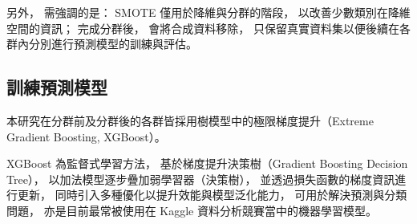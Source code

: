 \documentclass[12pt,a4paper,oneside]{book}
\begin{document}
\begin{enumerate}
	另外，
	需強調的是：
	SMOTE 僅用於降維與分群的階段，
	以改善少數類別在降維空間的資訊；
	完成分群後，
	會將合成資料移除，
	只保留真實資料集以便後續在各群內分別進行預測模型的訓練與評估。

		
	\end{enumerate}

	\subsection{訓練預測模型}

	本研究在分群前及分群後的各群皆採用樹模型中的極限梯度提升（Extreme Gradient Boosting, XGBoost）。

	XGBoost 為監督式學習方法，
	基於梯度提升決策樹（Gradient Boosting Decision Tree），
	以加法模型逐步疊加弱學習器（決策樹），
	並透過損失函數的梯度資訊進行更新，
	同時引入多種優化以提升效能與模型泛化能力，
	可用於解決預測與分類問題，
	亦是目前最常被使用在 Kaggle 資料分析競賽當中的機器學習模型。
	
\end{document}
